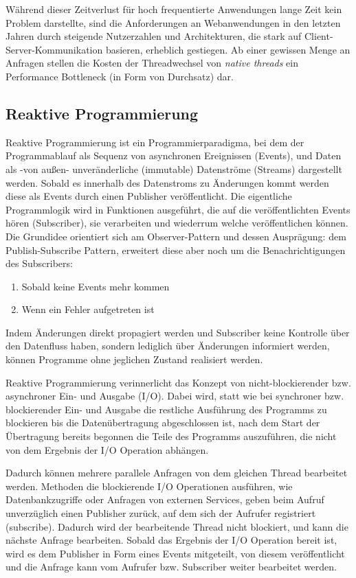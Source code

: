 Während dieser Zeitverlust für hoch frequentierte Anwendungen lange Zeit kein Problem darstellte,
sind die Anforderungen an Webanwendungen in den letzten Jahren durch steigende Nutzerzahlen und Architekturen,
die stark auf Client-Server-Kommunikation basieren, erheblich gestiegen.
Ab einer gewissen Menge an Anfragen stellen die Kosten der Threadwechsel von \textit{native threads} ein Performance Bottleneck
(in Form von Durchsatz) dar.

\subsection{Reaktive Programmierung}
\label{section:reaktive_programmierung}
Reaktive Programmierung ist ein Programmierparadigma, bei dem der Programmablauf als Sequenz von asynchronen Ereignissen (Events), und
Daten als -von außen- unveränderliche (immutable) Datenströme (Streams) dargestellt werden.
Sobald es innerhalb des Datenstroms zu Änderungen kommt werden diese als Events durch einen Publisher veröffentlicht.
Die eigentliche Programmlogik wird in Funktionen ausgeführt, die auf die veröffentlichten Events hören (Subscriber), sie verarbeiten und wiederrum welche
veröffentlichen können. Die Grundidee orientiert sich am Observer-Pattern und dessen Ausprägung: dem Publish-Subscribe Pattern, erweitert diese aber
noch um die Benachrichtigungen des Subscribers:
\begin{enumerate}
    \item Sobald keine Events mehr kommen
    \item Wenn ein Fehler aufgetreten ist
\end{enumerate}

Indem Änderungen direkt propagiert werden und Subscriber keine Kontrolle über den Datenfluss haben, sondern lediglich über Änderungen informiert werden,
können Programme ohne jeglichen Zustand realisiert werden.

Reaktive Programmierung verinnerlicht das Konzept von nicht-blockierender bzw. asynchroner Ein- und Ausgabe (I/O).
Dabei wird, statt wie bei synchroner bzw. blockierender Ein- und Ausgabe die restliche Ausführung des Programms
zu blockieren bis die Datenübertragung abgeschlossen ist, nach dem Start der Übertragung bereits begonnen die Teile des
Programms auszuführen, die nicht von dem Ergebnis der I/O Operation abhängen.

Dadurch können mehrere parallele Anfragen von dem gleichen Thread bearbeitet werden.
Methoden die blockierende I/O Operationen ausführen, wie Datenbankzugriffe oder Anfragen von externen Services,
geben beim Aufruf unverzüglich einen Publisher zurück, auf dem sich der Aufrufer registriert (subscribe).
Dadurch wird der bearbeitende Thread nicht blockiert, und kann die nächste Anfrage bearbeiten.
Sobald das Ergebnis der I/O Operation bereit ist, wird es dem Publisher in Form eines Events mitgeteilt, von diesem veröffentlicht und die Anfrage kann
vom Aufrufer bzw. Subscriber weiter bearbeitet werden.

